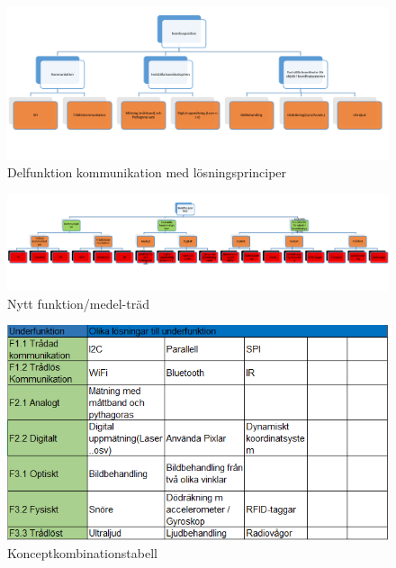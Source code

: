 \documentclass[11pt, a4paper]{report}
\begin{document}
\begin{figure}[H]
	\begin{center}
		\includegraphics [width=12cm,angle=0]{funktionmedel.png}
		\caption{Delfunktion kommunikation med lösningsprinciper}
		\label{fig:funktionmedel}
	\end{center}
\end{figure}

\begin{figure}[H]
	\begin{center}
		\includegraphics [width=12cm,angle=0]{funktionmedel2.png}
		\caption{Nytt funktion/medel-träd}
		\label{fig:funktionmedel2}
	\end{center}
\end{figure}

\begin{figure}[H]
	\begin{center}
		\includegraphics [width=12cm,angle=0]{konceptkombtabell.png}
		\caption{Konceptkombinationstabell}
		\label{fig:koncepttabell1}
	\end{center}
\end{figure}
\end{document}
